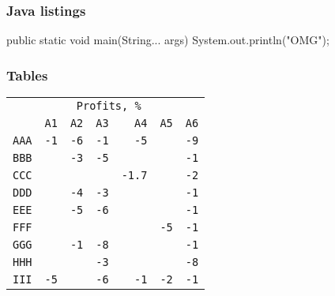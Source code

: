 \documentclass[russian,aspectratio=169,14pt]{beamer}
\begin{document}
\begin{frame}[fragile]
\frametitle{Java listings}
\begin{listjava}
public static void main(String... args) {
	System.out.println("OMG");
}
\end{listjava}
\end{frame}

\begin{frame}
\frametitle{Tables}
\begin{center}
	\begin{tabular}{l||r|r|r|r|r||r}
		\small
		& \multicolumn{5}{c}{\texttt{Profits, \%}} & \\
		&  \texttt{A1} & \texttt{A2} & \texttt{A3} & \texttt{A4} & \texttt{A5}	& \texttt{A6} 	\\
		\hline
		\hline
		\texttt{AAA} & \texttt{-1}	& \texttt{-6}	& \texttt{-1}	& \texttt{-5}	&		& \texttt{-9} \\
		\hline
		\texttt{BBB} &			& \texttt{-3}	& \texttt{-5}	&		&		& \texttt{-1} \\
		\hline
		\texttt{CCC} &			&		&		& \texttt{-1.7}	&		& \texttt{-2} \\
		\hline
		\texttt{DDD} &			& \texttt{-4}	& \texttt{-3}	&		&		& \texttt{-1} \\
		\hline
		\texttt{EEE} &			& \texttt{-5}	& \texttt{-6}	&		&		& \texttt{-1} \\
		\hline
		\texttt{FFF} &			&		&		&		& \texttt{-5}	& \texttt{-1} \\
		\hline
		\texttt{GGG} &			& \texttt{-1}	& \texttt{-8}	&		&		& \texttt{-1} \\
		\hline
		\texttt{HHH} &			&		& \texttt{-3}	&		&		& \texttt{-8} \\
		\hline
		\texttt{III} & \texttt{-5}	&		& \texttt{-6}	& \texttt{-1}	& \texttt{-2}	& \texttt{-1} \\
	\end{tabular}
\end{center}
\end{frame}
\end{document}
